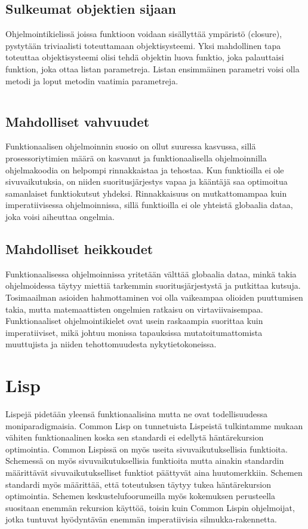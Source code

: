 \documentclass[12pt]{article}
\begin{document}
\subsection{Sulkeumat objektien sijaan}
Ohjelmointikielissä joissa funktioon voidaan sisällyttää ympäristö (closure), pystytään triviaalisti toteuttamaan objektisysteemi.
Yksi mahdollinen tapa toteuttaa objektisysteemi olisi tehdä objektin luova funktio, joka palauttaisi funktion, joka ottaa listan parametreja.
Listan ensimmäinen parametri voisi olla metodi ja loput metodin vaatimia parametreja.
\begin{lstlisting}

\end{lstlisting}


\subsection{Mahdolliset vahvuudet}
Funktionaalisen ohjelmoinnin suosio on ollut suuressa kasvussa, sillä prosessoriytimien määrä on kasvanut ja funktionaalisella ohjelmoinnilla ohjelmakoodia on helpompi rinnakkaistaa ja tehostaa. Kun funktioilla ei ole sivuvaikutuksia, on niiden suoritusjärjestys vapaa ja kääntäjä saa optimoitua samanlaiset funktiokutsut yhdeksi. Rinnakkaisuus on mutkattomampaa kuin imperatiivisessa ohjelmoinnissa, sillä funktioilla ei ole yhteistä globaalia dataa, joka voisi aiheuttaa ongelmia.
\subsection{Mahdolliset heikkoudet}
Funktionaalisessa ohjelmoinnissa yritetään välttää globaalia dataa, minkä takia ohjelmoidessa täytyy miettiä tarkemmin suoritusjärjestystä ja putkittaa kutsuja. Tosimaailman asioiden hahmottaminen voi olla vaikeampaa olioiden puuttumisen takia, mutta matemaattisten ongelmien ratkaisu on virtaviivaisempaa. Funktionaaliset ohjelmointikielet ovat usein raskaampia suorittaa kuin imperatiiviset, mikä johtuu monissa tapauksissa mutatoitumattomista muuttujista ja niiden tehottomuudesta nykytietokoneissa.

\section{Lisp}
Lispejä pidetään yleensä funktionaalisina mutta ne ovat todellisuudessa moniparadigmaisia. Common Lisp on tunnetuista Lispeistä tulkintamme mukaan vähiten funktionaalinen koska sen standardi ei edellytä häntärekursion optimointia. Common Lispissä on myös useita sivuvaikutuksellisia funktioita. Schemessä on myös sivuvaikutuksellisia funktioita mutta ainakin standardin määrittävät sivuvaikutukselliset funktiot päättyvät aina huutomerkkiin. Schemen standardi myös määrittää, että toteutuksen täytyy tukea häntärekursion optimointia. Schemen keskustelufoorumeilla myös kokemuksen perusteella suositaan enemmän rekursion käyttöä, toisin kuin Common Lispin ohjelmoijat, jotka tuntuvat hyödyntävän enemmän imperatiivisia silmukka-rakennetta.
\end{document}
